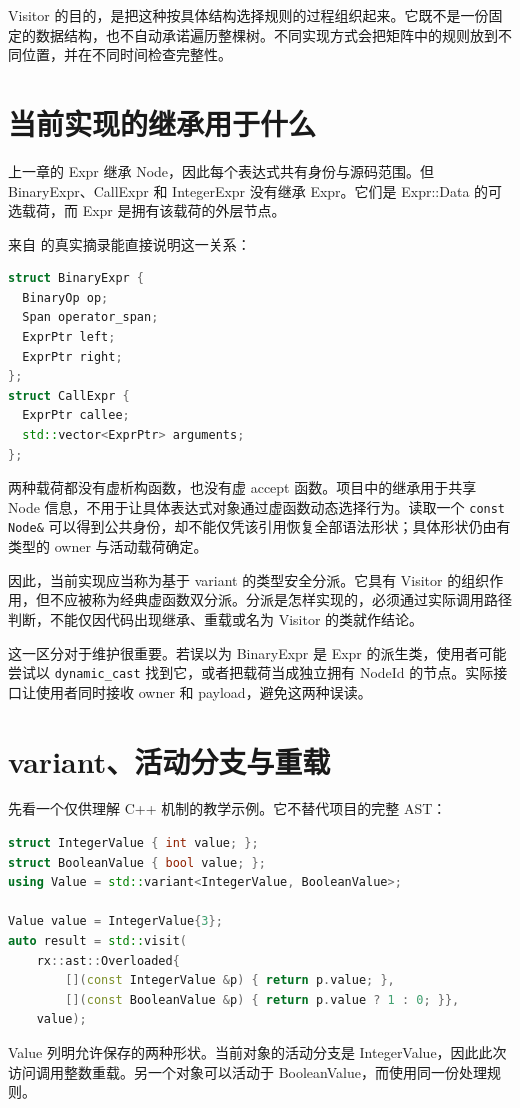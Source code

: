 Visitor 的目的，是把这种按具体结构选择规则的过程组织起来。它既不是一份固定的数据结构，也不自动承诺遍历整棵树。不同实现方式会把矩阵中的规则放到不同位置，并在不同时间检查完整性。

\section{当前实现的继承用于什么}
上一章的 Expr 继承 Node，因此每个表达式共有身份与源码范围。但 BinaryExpr、CallExpr 和 IntegerExpr 没有继承 Expr。它们是 Expr::Data 的可选载荷，而 Expr 是拥有该载荷的外层节点。

来自  的真实摘录能直接说明这一关系：
\begin{lstlisting}[language=C++]
struct BinaryExpr {
  BinaryOp op;
  Span operator_span;
  ExprPtr left;
  ExprPtr right;
};
struct CallExpr {
  ExprPtr callee;
  std::vector<ExprPtr> arguments;
};
\end{lstlisting}
两种载荷都没有虚析构函数，也没有虚 accept 函数。项目中的继承用于共享 Node 信息，不用于让具体表达式对象通过虚函数动态选择行为。读取一个 \texttt{const Node\&} 可以得到公共身份，却不能仅凭该引用恢复全部语法形状；具体形状仍由有类型的 owner 与活动载荷确定。

因此，当前实现应当称为基于 variant 的类型安全分派。它具有 Visitor 的组织作用，但不应被称为经典虚函数双分派。分派是怎样实现的，必须通过实际调用路径判断，不能仅因代码出现继承、重载或名为 Visitor 的类就作结论。

这一区分对于维护很重要。若误以为 BinaryExpr 是 Expr 的派生类，使用者可能尝试以 \texttt{dynamic\_cast} 找到它，或者把载荷当成独立拥有 NodeId 的节点。实际接口让使用者同时接收 owner 和 payload，避免这两种误读。

\section{variant、活动分支与重载}
先看一个仅供理解 C++ 机制的教学示例。它不替代项目的完整 AST：
\begin{lstlisting}[language=C++]
struct IntegerValue { int value; };
struct BooleanValue { bool value; };
using Value = std::variant<IntegerValue, BooleanValue>;

Value value = IntegerValue{3};
auto result = std::visit(
    rx::ast::Overloaded{
        [](const IntegerValue &p) { return p.value; },
        [](const BooleanValue &p) { return p.value ? 1 : 0; }},
    value);
\end{lstlisting}
Value 列明允许保存的两种形状。当前对象的活动分支是 IntegerValue，因此此次访问调用整数重载。另一个对象可以活动于 BooleanValue，而使用同一份处理规则。

